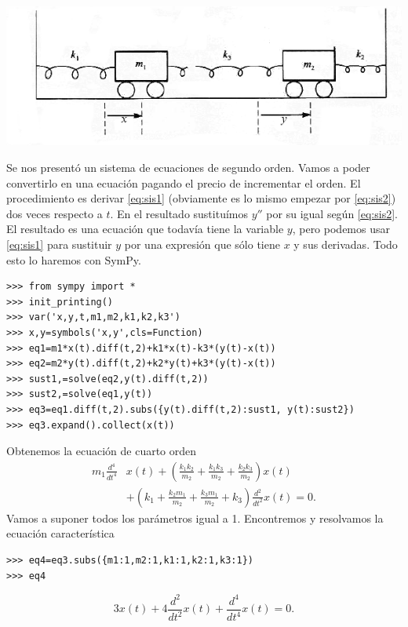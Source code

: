 \begin{center}
  \includegraphics[scale=.4]{imagenes/osci_aco.png}
\end{center}


Se nos presentó un sistema de ecuaciones de segundo orden. Vamos a poder convertirlo en una ecuación pagando el precio de incrementar el orden. El procedimiento es derivar \eqref{eq:sis1} (obviamente es lo mismo empezar por \eqref{eq:sis2}) dos veces respecto a $t$. En el resultado sustituímos $y''$ por su igual según \eqref{eq:sis2}. El resultado es una ecuación que todavía tiene la variable $y$, pero podemos usar \eqref{eq:sis1} para sustituir $y$ por una expresión que sólo tiene $x$ y sus derivadas. Todo esto lo haremos con SymPy.



\begin{lstlisting}
>>> from sympy import *
>>> init_printing()
>>> var('x,y,t,m1,m2,k1,k2,k3')
>>> x,y=symbols('x,y',cls=Function)
>>> eq1=m1*x(t).diff(t,2)+k1*x(t)-k3*(y(t)-x(t))
>>> eq2=m2*y(t).diff(t,2)+k2*y(t)+k3*(y(t)-x(t))
>>> sust1,=solve(eq2,y(t).diff(t,2))
>>> sust2,=solve(eq1,y(t))
>>> eq3=eq1.diff(t,2).subs({y(t).diff(t,2):sust1, y(t):sust2})
>>> eq3.expand().collect(x(t))
\end{lstlisting}
 Obtenemos la ecuación de cuarto orden
\[
\begin{split}
 m_{1} \frac{d^{4}}{d t^{4}} & x{\left (t \right )} + \left(\frac{k_{1} k_{2}}{m_{2}} + \frac{k_{1} k_{3}}{m_{2}} + \frac{k_{2} k_{3}}{m_{2}}\right) x{\left (t \right )}\\ &+ \left(k_{1} + \frac{k_{2} m_{1}}{m_{2}} + \frac{k_{3} m_{1}}{m_{2}} + k_{3}\right) \frac{d^{2}}{d t^{2}}  x{\left (t \right )}=0.
\end{split}
\]
 Vamos a suponer todos los parámetros igual a 1. Encontremos y resolvamos la ecuación característica
 \begin{lstlisting}
>>> eq4=eq3.subs({m1:1,m2:1,k1:1,k2:1,k3:1})
>>> eq4
\end{lstlisting}
\[3 x{\left (t \right )} + 4 \frac{d^{2}}{d t^{2}}  x{\left (t \right )} + \frac{d^{4}}{d t^{4}}  x{\left (t \right )}=0.\]





